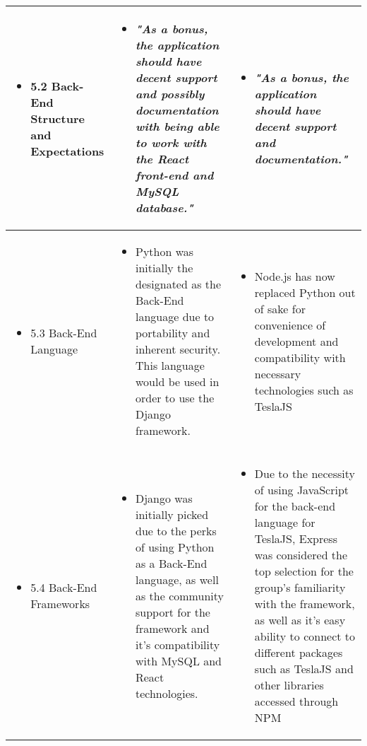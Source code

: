 \documentclass[onecolumn, draftclsnofoot,10pt, compsoc]{IEEEtran}
\begin{document}
\begin{longtable}{p{} | p{} | p{}}
        \\\hline
        \begin{itemize}
            \item 5.2 Back-End Structure and Expectations
        \end{itemize}
        & \begin{itemize}
            \item \textit{"As a bonus, the application should have decent support and possibly documentation with being able to work with the React front-end and MySQL database."}
        \end{itemize}
        & \begin{itemize}
            \item \textit{"As a bonus, the application should have decent support and documentation."}
        \end{itemize}
        \\\hline
        \begin{itemize}
            \item 5.3 Back-End Language
        \end{itemize}
        & \begin{itemize}
            \item Python was initially the designated as the Back-End language due to portability and inherent security. This language would be used in order to use the Django  framework.
        \end{itemize}
        & \begin{itemize}
            \item Node.js has now replaced Python out of sake for convenience of development and compatibility with necessary technologies such as TeslaJS
        \end{itemize}
        \\\hline
        \begin{itemize}
            \item 5.4 Back-End Frameworks
        \end{itemize}
        & \begin{itemize}
            \item Django was initially picked due to the perks of using Python as a Back-End language, as well as the community support for the framework and it's compatibility with MySQL and React technologies.
        \end{itemize}
        & \begin{itemize}
            \item Due to the necessity of using JavaScript for the back-end language for TeslaJS, Express was considered the top selection for the group's familiarity with the framework, as well as it's easy ability to connect to different packages such as TeslaJS and other libraries accessed through NPM

\end{itemize}
\end{longtable}
\end{document}
